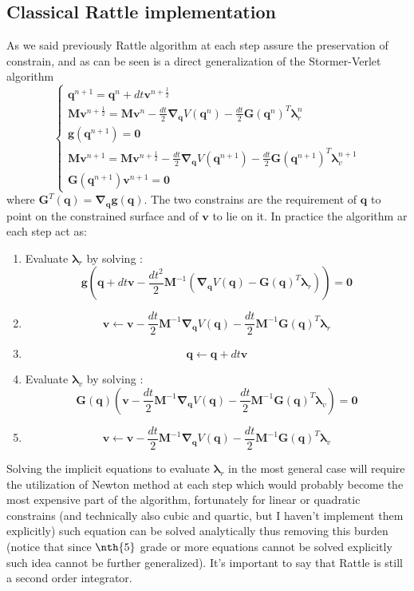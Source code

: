 \documentclass[10pt,a4paper]{article}
\begin{document}
\subsection{Classical Rattle implementation}
As we said previously Rattle algorithm at each step assure the preservation of constrain, and as can be seen is a direct generalization of the Stormer-Verlet algorithm
\[
\begin{cases}
\bm{q}^{n+1} =  \bm{q}^n + dt\bm{v}^{n+\frac{1}{2}}\\
\bm{M}\bm{v}^{n+\frac{1}{2}} = \bm{M}\bm{v}^n-\frac{dt}{2}\bm{\nabla}_{\bm q}V(\bm{q}^n)-\frac{dt}{2} \bm{G}(\bm{q}^n)^T\bm{\lambda}_r^n\\
\bm{g}(\bm{q}^{n+1}) = \bm{0}\\
\bm{M}\bm{v}^{n+1} = \bm{M}\bm{v}^{n+\frac{1}{2}}-\frac{dt}{2}\bm{\nabla}_{\bm q}V(\bm{q}^{n+1})-\frac{dt}{2} \bm{G}(\bm{q}^{n+1})^T\bm{\lambda}_v^{n+1}\\
\bm{G}(\bm{q}^{n+1})\bm{v}^{n+1} = \bm{0}
\end{cases}
\]
where $\bm{G}^T(\bm{q})=\bm{\nabla}_{\bm q}\bm{g}(\bm{q})$. The two constrains are the requirement of $\bm{q}$ to point on the constrained surface and of $\bm{v}$ to lie on it.
In practice the algorithm ar each step act as:
\begin{enumerate}
	\item Evaluate $\bm{\lambda}_r$ by solving :
	\[ \bm{g}(\bm{q} + dt\bm{v}-\frac{dt^2}{2}\bm{M}^{-1}(\bm{\nabla}_{\bm q}V(\bm{q})-\bm{G}(\bm{q})^T\bm{\lambda}_r)) = \bm{0} \]
	\item 
	\[
	\bm{v} \leftarrow \bm{v}-\frac{dt}{2}\bm{M}^{-1}\bm{\nabla}_{\bm q}V(\bm{q})-\frac{dt}{2} \bm{M}^{-1}\bm{G}(\bm{q})^T\bm{\lambda}_r
	\]
	\item
	\[ \bm{q} \leftarrow  \bm{q} + dt\bm{v} \]
	\item Evaluate $\bm{\lambda}_v$ by solving :
	\[
	\bm{G}(\bm{q})(\bm{v}-\frac{dt}{2}\bm{M}^{-1}\bm{\nabla}_{\bm q}V(\bm{q})-\frac{dt}{2}\bm{M}^{-1} \bm{G}(\bm{q})^T\bm{\lambda}_v) = \bm{0}
	\]
	\item
	\[
	\bm{v} \leftarrow \bm{v}-\frac{dt}{2}\bm{M}^{-1}\bm{\nabla}_{\bm q}V(\bm{q})-\frac{dt}{2} \bm{M}^{-1}\bm{G}(\bm{q})^T\bm{\lambda}_v
	\]
\end{enumerate}
Solving the implicit equations to evaluate $\bm{\lambda}_r$ in the most general case will require the utilization of Newton method at each step which would probably become the most expensive part of the algorithm, fortunately for linear or quadratic constrains (and technically also cubic and quartic, but I haven't implement them explicitly) such equation can be solved analytically thus removing this burden (notice that since $\nth{5}$ grade or more equations cannot be solved explicitly such idea cannot be further generalized).
It's important to say that Rattle is still a second order integrator.
\newline
\end{document}
